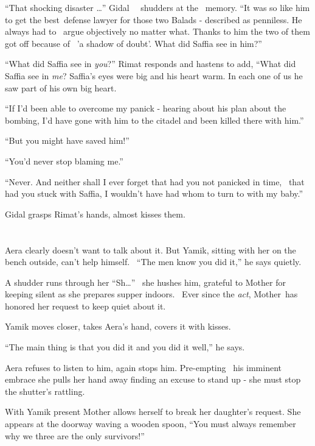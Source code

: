 \documentclass[twoside,11pt]{book}
\begin{document}
``That shocking disaster {\dots}'' Gidal{ \ \ }shudders at the
{\ }memory. ``It was so like him to get the best~defense lawyer for those two Balads -
described as penniless. He always had to \ argue objectively no matter what. Thanks to him the two of them got off
because of \ {}'a shadow of doubt'. What did Saffia see in him?''

``What did Saffia see in \textit{you}?'' Rimat responds and hastens to add,
``What did Saffia see in \textit{me}? Saffia's eyes were big and his heart warm. In each one of us he saw
part of his own{ big heart}.

``If I'd been able to overcome my panick - hearing about his plan about the bombing, I'd have gone with him
to the citadel and been killed there with him.''

``But you might have saved him!''

``You'd never stop blaming me.''

``Never. And neither shall I ever forget that had you not panicked in time, {\ }that had you
stuck with Saffia, I wouldn't have had whom to turn to with my baby.''

Gidal grasps Rimat's hands, almost kisses them. ~


\bigskip

\chapter{}

Aera clearly doesn't want to talk about it. But Yamik, sitting with her on the bench outside, can't help himself.
\ ``The men know you did it,'' he says quietly.

A shudder runs through her ``Sh{\dots}'' \ she hushes him, grateful to Mother for keeping
silent as she prepares supper indoors.~ Ever since the \textit{act}, Mother~has honored her request to keep quiet about
it.

Yamik moves closer, takes Aera's hand, covers it with kisses.

``The main thing is that you did it and you did it well,'' he says.

Aera refuses to listen to him, again stops him. Pre-empting{ }\ his imminent embrace she pulls her hand
away finding an excuse to stand up - she must stop the shutter's rattling.

With Yamik present Mother allows herself to break her daughter's request. She appears at the doorway waving a wooden
spoon, ``You must always remember why we three are the only survivors!''
\end{document}
